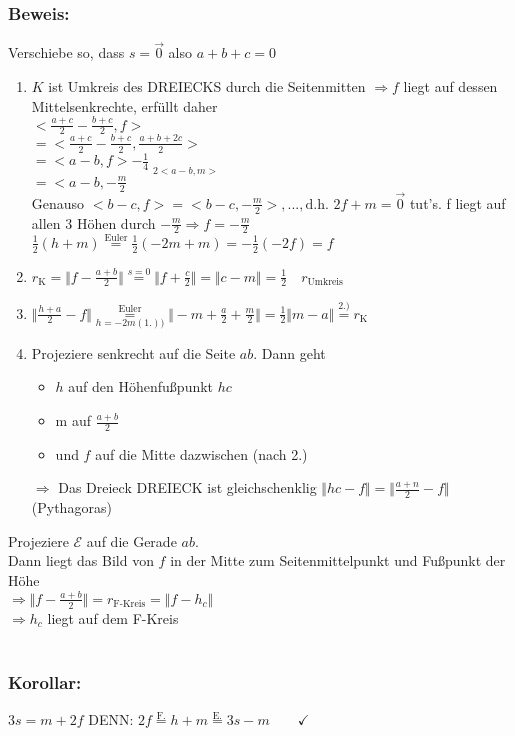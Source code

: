 \subsubsection{Beweis:}
Verschiebe so, dass $s=\vec{0}$ also $a+b+c=0$ 
\begin{enumerate}
	\item $K$ ist Umkreis des DREIECKS durch die Seitenmitten $\Rightarrow f$ liegt 
	auf dessen Mittelsenkrechte, erfüllt daher \\ 
	$<\frac{a+c}{2}-\frac{b+c}{2},f>$\\
	$=<\frac{a+c}{2}-\frac{b+c}{2}, \frac{a+b+2c}{2}>$\\
	$= <a-b,f> -\frac{1}{4}\mathop{\underbrace{<a-b,a+b>}}\limits_{2<a-b,m>}$\\
	$=<a-b,-\frac{m}{2}$\\
	Genauso $<b-c,f>=<b-c,-\frac{m}{2}>,..., \text{d.h. }2f+m=\vec{0}$ tut's. f liegt auf 
	allen 3 Höhen durch $-\frac{m}{2} \Rightarrow f = -\frac{m}{2}$\\
	$\frac{1}{2}(h+m)\mathop{=}\limits^{\text{Euler}}\frac{1}{2}(-2m+m)=-\frac{1}{2}
	(-2f)=f$
	\item $r_{\text{K}}=\Vert f-\frac{a+b}{2}\Vert\mathop{=}\limits^{s=0}\Vert f+\frac{c}
	{2}\Vert = \Vert c-m \Vert = \frac{1}{2} \quad r_{\text{Umkreis}}$
	\item $\Vert \frac{h+a}{2}-f \Vert \mathop{=}\limits^{\text{Euler}}_{h=-2m (1.))}\Vert 
	-m+\frac{a}{2}+\frac{m}{2}\Vert = \frac{1}{2} \Vert m-a \Vert  
	\mathop{=}\limits^{2.)}r_{\text{K}}$
	\item Projeziere senkrecht auf die Seite $ab$. Dann geht 
	\begin{itemize}
		\item $h$ auf den Höhenfußpunkt $hc$
		\item m auf $\frac{a+b}{2}$
		\item und $f$ auf die Mitte dazwischen (nach 2.) 
	\end{itemize}
	$\Rightarrow$ Das Dreieck DREIECK ist gleichschenklig $\Vert hc-f \Vert = \Vert 
	\frac{a+n}{2} -f \Vert$ (Pythagoras)
\end{enumerate}
Projeziere $\mathcal{E}$ auf die Gerade $ab$. \\
Dann liegt das Bild von $f$ in der Mitte zum Seitenmittelpunkt und Fußpunkt der Höhe\\
$\Rightarrow \Vert f-\frac{a+b}{2}\Vert = r_{\text{F-Kreis}}=\Vert f-h_{c} \Vert$\\
$\Rightarrow h_{c}$ liegt auf dem F-Kreis\\
\qquad\\
\subsubsection{Korollar:}
$3s=m+2f$ DENN: $2f \mathop{=}\limits^{\text{F.}}h+m \mathop{=}\limits^{\text{E.}}3s-m \qquad \checkmark$